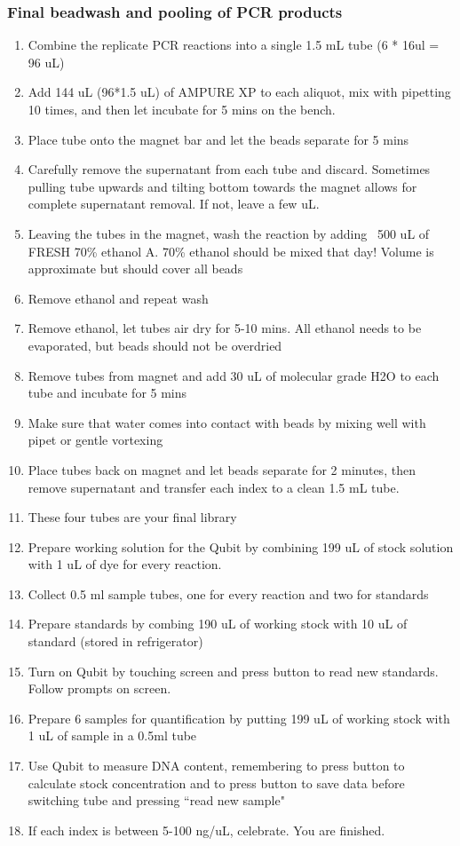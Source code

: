 \documentclass[11pt, oneside]{article}
\begin{document}
\subsubsection{Final beadwash and pooling of PCR products}	
	\begin{enumerate}
	\item Combine the replicate PCR reactions into a single 1.5 mL tube (6 * 16ul = 96 uL)
	\item Add 144 uL (96*1.5 uL) of AMPURE XP to each aliquot, mix with pipetting 10 times, and then let incubate for 5 mins on the bench.
	\item Place tube onto the magnet bar and let the beads separate for 5 mins
	\item Carefully remove the supernatant from each tube and discard.  Sometimes pulling tube upwards and tilting bottom towards the magnet allows for complete supernatant removal. If not, leave a few uL.
	\item Leaving the tubes in the magnet, wash the reaction by adding ~500 uL of FRESH 70\% ethanol A. 70\% ethanol should be mixed that day! Volume is approximate but should cover all beads
	\item Remove ethanol and repeat wash
	\item Remove ethanol, let tubes air dry for 5-10 mins. All ethanol needs to be evaporated, but beads should not be overdried
	\item Remove tubes from magnet and add 30 uL of molecular grade H2O to each tube and incubate for 5 mins
	\item Make sure that water comes into contact with beads by mixing well with pipet or gentle vortexing
	\item Place tubes back on magnet and let beads separate for 2 minutes, then remove supernatant and transfer each index to a clean 1.5 mL tube.
	\item These four tubes are your final library
	\item Prepare working solution for the Qubit by combining 199 uL of stock solution with 1 uL of dye for every reaction.
	\item Collect 0.5 ml sample tubes, one for every reaction and two for standards
	\item Prepare standards by combing 190 uL of working stock with 10 uL of standard (stored in refrigerator)
	\item Turn on Qubit by touching screen and press button to read new standards. Follow prompts on screen.
	\item Prepare 6 samples for quantification by putting 199 uL of working stock with 1 uL of sample in a 0.5ml tube
	\item Use Qubit to measure DNA content, remembering to press button to calculate stock concentration and to press button to save data before switching tube and pressing ``read new sample"
	\item If each index is between 5-100 ng/uL, celebrate. You are finished.
	\end{enumerate}
				
\end{document}
